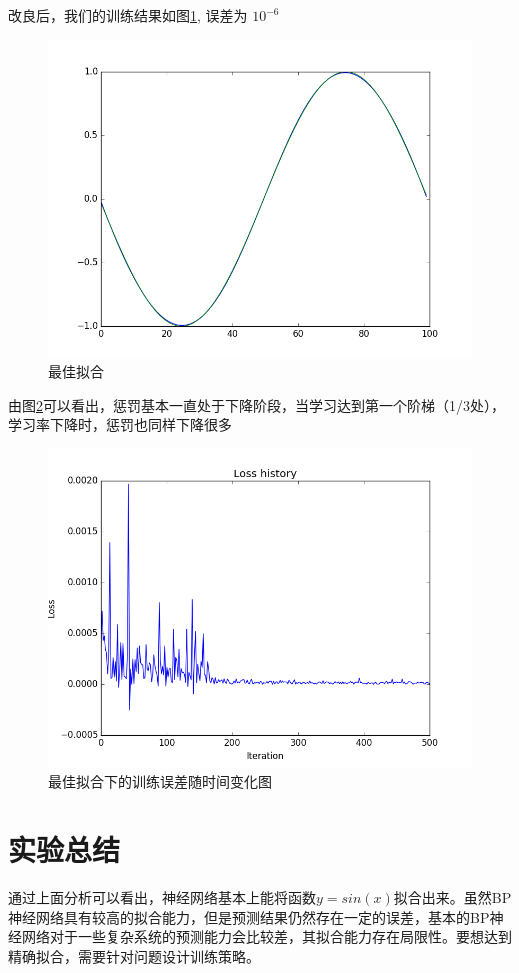 \documentclass{article}
\begin{document}
\begin{CJK}{UTF8}{gkai}
改良后，我们的训练结果如图\ref{fig:fig2}, 误差为 $10^{-6}$
\begin{figure}
	\centering
	\includegraphics[width=\linewidth]{../fig2}
	\caption{最佳拟合}
	\label{fig:fig2}
\end{figure}

由图\ref{fig:loss}可以看出，惩罚基本一直处于下降阶段，当学习达到第一个阶梯（1/3处），学习率下降时，惩罚也同样下降很多
\begin{figure}[h]
	\centering
	\includegraphics[width=\linewidth]{../loss}
	\caption{最佳拟合下的训练误差随时间变化图}
	\label{fig:loss}
\end{figure}

\section{实验总结}
通过上面分析可以看出，神经网络基本上能将函数$y=sin(x)$拟合出来。虽然BP神经网络具有较高的拟合能力，但是预测结果仍然存在一定的误差，基本的BP神经网络对于一些复杂系统的预测能力会比较差，其拟合能力存在局限性。要想达到精确拟合，需要针对问题设计训练策略。
{\small
	
	
}
\end{CJK}
\end{document}
